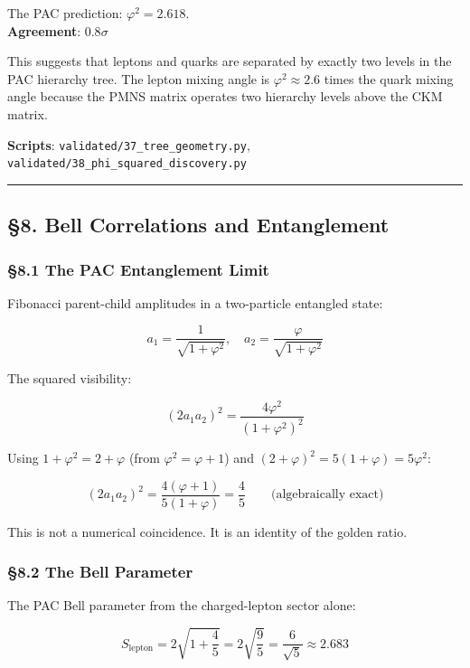 \documentclass[
  11pt,
  a4paper]{article}
\begin{document}
The PAC prediction: \(\varphi^2 = 2.618\).\\
\textbf{Agreement}: \(0.8\sigma\)

This suggests that leptons and quarks are separated by exactly two
levels in the PAC hierarchy tree. The lepton mixing angle is
\(\varphi^2 \approx 2.6\) times the quark mixing angle because the PMNS
matrix operates two hierarchy levels above the CKM matrix.

\textbf{Scripts}: \texttt{validated/37\_tree\_geometry.py},
\texttt{validated/38\_phi\_squared\_discovery.py}

\begin{center}\rule{0.5\linewidth}{0.5pt}\end{center}

\subsection{§8. Bell Correlations and
Entanglement}\label{bell-correlations-and-entanglement}

\subsubsection{§8.1 The PAC Entanglement
Limit}\label{the-pac-entanglement-limit}

Fibonacci parent-child amplitudes in a two-particle entangled state:

\[a_1 = \frac{1}{\sqrt{1+\varphi^2}}, \quad a_2 = \frac{\varphi}{\sqrt{1+\varphi^2}}\]

The squared visibility:

\[(2a_1 a_2)^2 = \frac{4\varphi^2}{(1+\varphi^2)^2}\]

Using \(1 + \varphi^2 = 2 + \varphi\) (from \(\varphi^2 = \varphi + 1\))
and \((2+\varphi)^2 = 5(1+\varphi) = 5\varphi^2\):

\[(2a_1 a_2)^2 = \frac{4(\varphi + 1)}{5(1 + \varphi)} = \frac{4}{5} \qquad \text{(algebraically exact)}\]

This is not a numerical coincidence. It is an identity of the golden
ratio.

\subsubsection{§8.2 The Bell Parameter}\label{the-bell-parameter}

The PAC Bell parameter from the charged-lepton sector alone:

\[S_{\text{lepton}} = 2\sqrt{1 + \frac{4}{5}} = 2\sqrt{\frac{9}{5}} = \frac{6}{\sqrt{5}} \approx 2.683\]
\end{document}
